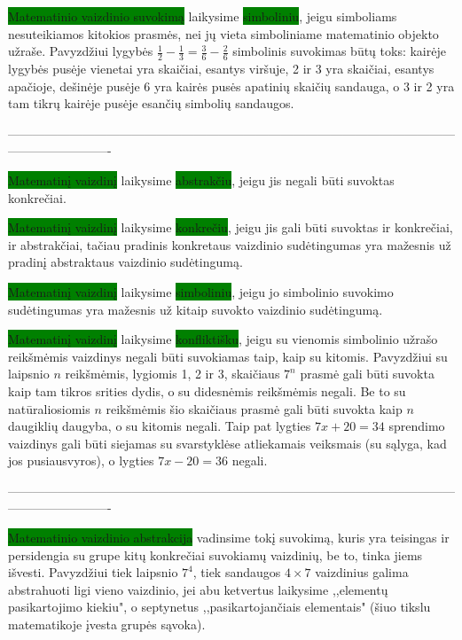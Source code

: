 \documentclass[a4paper]{article}
\begin{document}
\colorbox{green}{Matematinio vaizdinio suvokimą} laikysime \colorbox{green}{simboliniu}, jeigu simboliams nesuteikiamos kitokios prasmės, nei jų vieta simboliniame matematinio objekto užraše. Pavyzdžiui lygybės $\frac{1}{2}-\frac{1}{3}=\frac{3}{6}-\frac{2}{6}$ simbolinis suvokimas būtų toks: kairėje lygybės pusėje vienetai yra skaičiai, esantys viršuje, 2 ir 3 yra skaičiai, esantys apačioje, dešinėje pusėje 6 yra kairės pusės apatinių skaičių sandauga, o 3 ir 2 yra tam tikrų kairėje pusėje esančių simbolių sandaugos.

-------------------------------------------------------------------------------------------------------------------------------------

\colorbox{green}{Matematinį vaizdinį} laikysime \colorbox{green}{abstrakčiu}, jeigu jis negali būti suvoktas konkrečiai. 

\colorbox{green}{Matematinį vaizdinį} laikysime \colorbox{green}{konkrečiu}, jeigu jis gali būti suvoktas ir konkrečiai, ir abstrakčiai, tačiau pradinis konkretaus vaizdinio sudėtingumas yra mažesnis už pradinį abstraktaus vaizdinio sudėtingumą.

\colorbox{green}{Matematinį vaizdinį} laikysime \colorbox{green}{simboliniu}, jeigu jo simbolinio suvokimo sudėtingumas yra mažesnis už kitaip suvokto vaizdinio sudėtingumą.

\colorbox{green}{Matematinį vaizdinį} laikysime \colorbox{green}{konfliktišku}, jeigu su vienomis simbolinio užrašo reikšmėmis vaizdinys negali būti suvokiamas taip, kaip su kitomis. Pavyzdžiui su laipsnio $n$ reikšmėmis, lygiomis 1, 2 ir 3, skaičiaus $7^n$ prasmė gali būti suvokta kaip tam tikros srities dydis, o su didesnėmis reikšmėmis negali. Be to su natūraliosiomis $n$ reikšmėmis šio skaičiaus prasmė gali būti suvokta kaip $n$ daugiklių daugyba, o su kitomis negali. Taip pat lygties $7x+20=34$ sprendimo vaizdinys gali būti siejamas su svarstyklėse atliekamais veiksmais (su sąlyga, kad jos pusiausvyros), o lygties $7x-20=36$ negali.

-------------------------------------------------------------------------------------------------------------------------------------

\colorbox{green}{Matematinio vaizdinio abstrakcija} vadinsime tokį suvokimą, kuris yra teisingas ir persidengia su grupe kitų konkrečiai suvokiamų vaizdinių, be to, tinka jiems išvesti. Pavyzdžiui tiek laipsnio $7^4$, tiek sandaugos $4\times 7$ vaizdinius galima abstrahuoti ligi vieno vaizdinio, jei abu ketvertus laikysime ,,elementų pasikartojimo kiekiu", o septynetus ,,pasikartojančiais elementais" (šiuo tikslu matematikoje įvesta grupės sąvoka).
\end{document}
